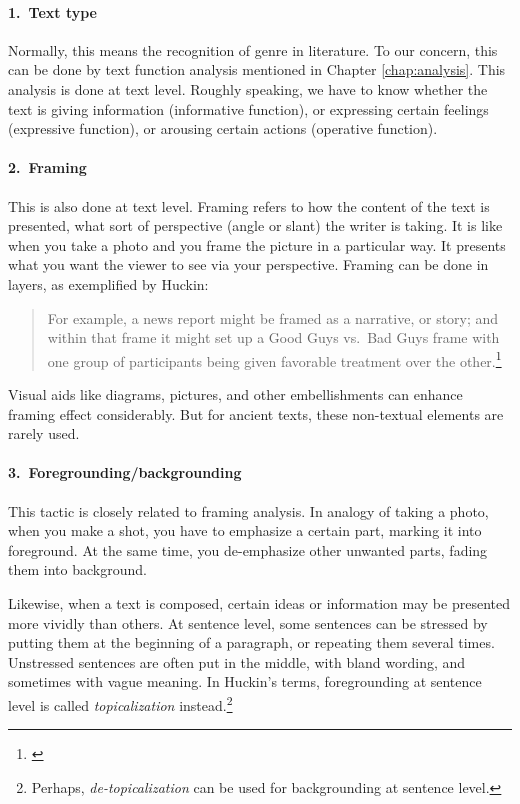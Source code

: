 \paragraph*{1.\ Text type} Normally, this means the recognition of genre in literature. To our concern, this can be done by text function analysis mentioned in Chapter \ref{chap:analysis}. This analysis is done at text level. Roughly speaking, we have to know whether the text is giving information (informative function), or expressing certain feelings (expressive function), or arousing certain actions (operative function).

\paragraph*{2.\ Framing} This is also done at text level. Framing refers to how the content of the text is presented, what sort of perspective (angle or slant) the writer is taking. It is like when you take a photo and you frame the picture in a particular way. It presents what you want the viewer to see via your perspective. Framing can be done in layers, as exemplified by Huckin:

\begin{quote}
For example, a news report might be framed as a narrative, or story; and within that frame it might set up a Good Guys vs.\ Bad Guys frame with one group of participants being given favorable treatment over the other.\footnote{\citealp[p.~82]{huckin:cda}}
\end{quote}

Visual aids like diagrams, pictures, and other embellishments can enhance framing effect considerably. But for ancient texts, these non-textual elements are rarely used.

\paragraph*{3.\ Foregrounding/backgrounding} This tactic is closely related to framing analysis. In analogy of taking a photo, when you make a shot, you have to emphasize a certain part, marking it into foreground. At the same time, you de-emphasize other unwanted parts, fading them into background.

Likewise, when a text is composed, certain ideas or information may be presented more vividly than others. At sentence level, some sentences can be stressed by putting them at the beginning of a paragraph, or repeating them several times. Unstressed sentences are often put in the middle, with bland wording, and sometimes with vague meaning. In Huckin's terms, foregrounding at sentence level is called \emph{topicalization} instead.\footnote{Perhaps, \emph{de-topicalization} can be used for backgrounding at sentence level.}

